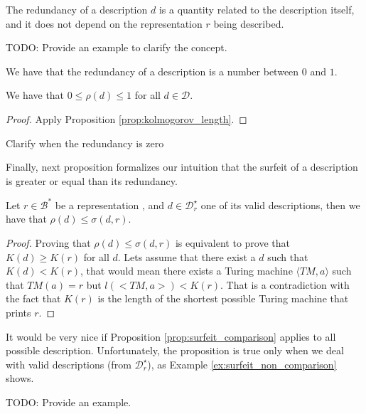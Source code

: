 The redundancy of a description $d$ is a quantity related to the description itself, and it does not depend on the representation $r$ being described.

\begin{example}
{\color{red} TODO: Provide an example to clarify the concept.}
\end{example}

We have that the redundancy of a description is  a number between $0$ and $1$.

\begin{proposition}
We have that $0 \leq \rho(d) \leq 1$ for all $d \in \mathcal{D}$.
\end{proposition}
\begin{proof}
Apply Proposition \ref{prop:kolmogorov_length}.
\end{proof}

{\color{red} Clarify when the redundancy is zero}

Finally, next proposition formalizes our intuition that the surfeit of a description is greater or equal than its redundancy.

\begin{proposition}
\label{prop:surfeit_comparison}
Let $r \in \mathcal{B}^\ast$ be a representation , and $d \in \mathcal{D}^\star_r$ one of its valid descriptions, then we have that $\rho(d) \leq \sigma(d, r)$.
\end{proposition}
\begin{proof}
Proving that $\rho(d) \leq \sigma(d, r)$ is equivalent to prove that $K(d) \geq K(r)$ for all $d$. Lets assume that there exist a $d$ such that $K(d) < K(r)$, that would mean there exists a Turing machine $\langle TM, a \rangle$ such that $TM(a)=r$ but $l(<TM, a>) < K(r)$. That is a contradiction with the fact that $K(r)$ is the length of the shortest possible Turing machine that prints $r$.
\end{proof}

It would be very nice if Proposition \ref{prop:surfeit_comparison} applies to all possible description. Unfortunately, the proposition is true only when we deal with valid descriptions (from $\mathcal{D}^\star_r$), as Example \ref{ex:surfeit_non_comparison} shows.

\begin{example}
\label{ex:surfeit_non_comparison}
{\color{red} TODO: Provide an example.}
\end{example}


%
%

